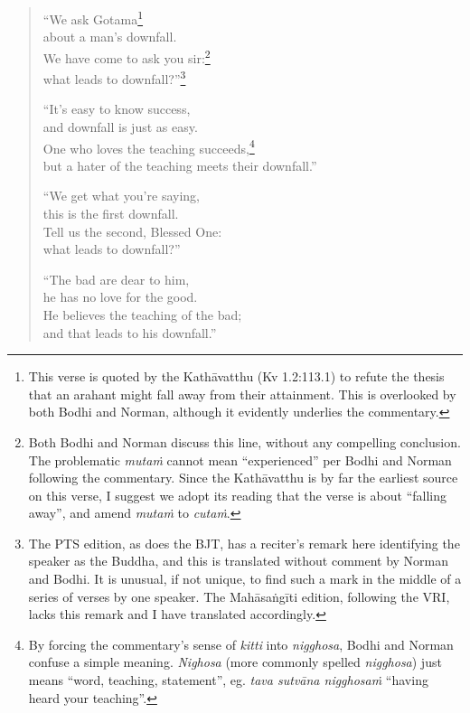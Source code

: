 \documentclass[12pt,openany]{book}%
\begin{document}
\begin{verse}%
“We ask Gotama\footnote{This verse is quoted by the \textsanskrit{Kathāvatthu} (Kv 1.2:113.1) to refute the thesis that an arahant might fall away from their attainment. This is overlooked by both Bodhi and Norman, although it evidently underlies the commentary. } \\
about a man’s downfall. \\
We have come to ask you sir:\footnote{Both Bodhi and Norman discuss this line, without any compelling conclusion. The problematic \textit{\textsanskrit{mutaṁ}} cannot mean “experienced” per Bodhi and Norman following the commentary. Since the \textsanskrit{Kathāvatthu} is by far the earliest source on this verse, I suggest we adopt its reading that the verse is about “falling away”, and amend \textit{\textsanskrit{mutaṁ}} to \textit{\textsanskrit{cutaṁ}}. } \\
what leads to downfall?”\footnote{The PTS edition, as does the BJT, has a reciter’s remark here identifying the speaker as the Buddha, and this is translated without comment by Norman and Bodhi. It is unusual, if not unique, to find such a mark in the middle of a series of verses by one speaker. The \textsanskrit{Mahāsaṅgīti} edition, following the VRI, lacks this remark and I have translated accordingly. } 

“It’s easy to know success, \\
and downfall is just as easy. \\
One who loves the teaching succeeds,\footnote{By forcing the commentary’s sense of \textit{kitti} into \textit{nigghosa}, Bodhi and Norman confuse a simple meaning. \textit{Nighosa} (more commonly spelled \textit{nigghosa}) just means “word, teaching, statement”, eg. \textit{tava \textsanskrit{sutvāna} \textsanskrit{nigghosaṁ}} “having heard your teaching”. } \\
but a hater of the teaching meets their downfall.” 

“We get what you’re saying, \\
this is the first downfall. \\
Tell us the second, Blessed One: \\
what leads to downfall?” 

“The bad are dear to him, \\
he has no love for the good. \\
He believes the teaching of the bad; \\
and that leads to his downfall.” 


\end{verse}
\end{document}
